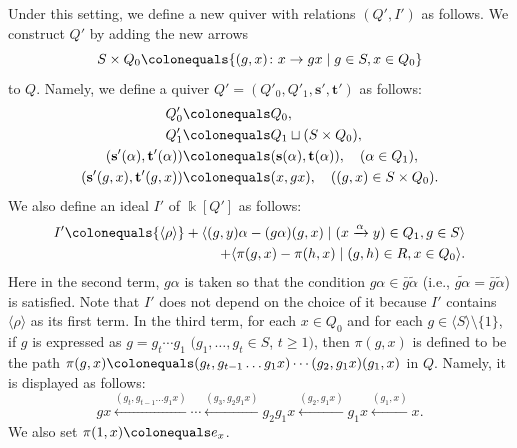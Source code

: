 \documentclass{surv-l}
\numberwithin{equation}{chapter}
\numberwithin{figure}{chapter}
\theoremstyle{plain}
\theoremstyle{definition}
\theoremstyle{remark}
\begin{document}
Under this setting, we define a new quiver with relations
$(Q', I')$ as follows.
We construct $Q'$ by adding the new arrows
\begin{equation*}
S \times Q_0\colonequals \{(g,x) \colon x \to gx \mid g \in S, x \in Q_0\}
\end{equation*}
to $Q$.
Namely, we define a quiver $Q'=(Q'_0, Q'_1, \mathbf{s}', \mathbf{t}')$ as follows:
\begin{equation*}
\begin{aligned}
Q_0'&\colonequals  Q_0,\\
Q_1'&\colonequals  Q_1 \sqcup (S \times Q_0),\\
(\mathbf{s}'(\alpha), \mathbf{t}'(\alpha))&\colonequals (\mathbf{s}(\alpha),\mathbf{t}(\alpha)),\quad (\alpha \in Q_1), \\
(\mathbf{s}'(g,x),\mathbf{t}'(g,x))&\colonequals (x,gx),\quad ((g,x) \in S \times Q_0).
\end{aligned}
\end{equation*}
We also define an ideal $I'$ of $\Bbbk[Q']$ as follows:
\begin{equation*}
\begin{split}
I'\colonequals  {\langle\rho \rangle}+{\langle(g,y)\alpha - (g\alpha)(g,x) \mid (x \xrightarrow{\alpha} y)
\in Q_1, g\in S \rangle}\\
+ {\langle\pi(g,x) - \pi(h,x)\mid (g,h) \in R, x \in Q_0 \rangle}.
\end{split}
\end{equation*}
Here in the second term, $g\alpha$ is taken so that the condition
$g\alpha \in \bar{g}\tilde{\alpha}$ (i.e., $\widetilde{g\alpha} = \bar{g}\tilde{\alpha}$) is satisfied.
Note that $I'$ does not depend on the choice of it because $I'$ contains ${\langle\rho \rangle}$
as its first term.
In the third term,
for each $x \in Q_0$ and for each $g \in {\langle S \rangle} \setminus \{1\}$,
if $g$ is expressed as $g=g_t\cdots g_1$ $(g_1,\dots, g_t \in S$, $t \ge 1)$, then
$\pi(g,x)$ is defined to be the path
$\pi(g,x)\colonequals (g_t, g_{t-1}\dots g_1x)\cdots (g_2,g_1x)(g_1,x)$
in $Q$.
Namely, it is displayed as follows:
\begin{equation*}
gx \xleftarrow{(g_t, g_{t-1}\dots g_1x)} \cdots
\xleftarrow{(g_3,g_2g_1x)} g_2g_1x \xleftarrow{(g_2,g_1x)} g_1 x \xleftarrow{(g_1,x)} x.
\end{equation*}
We also set $\pi(1,x)\colonequals  e_x$.
\end{document}
